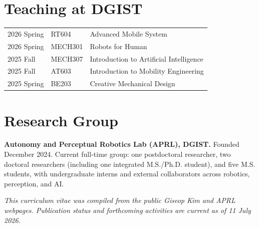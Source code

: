 \documentclass[10pt,a4paper]{article}
\begin{document}
\section{Teaching at DGIST}
\begin{tabularx}{\textwidth}{@{}L{26mm}L{24mm}Y@{}}
2026 Spring & RT604 & Advanced Mobile System \\
2026 Spring & MECH301 & Robots for Human \\
2025 Fall & MECH307 & Introduction to Artificial Intelligence \\
2025 Fall & AT603 & Introduction to Mobility Engineering \\
2025 Spring & BE203 & Creative Mechanical Design \\
\end{tabularx}

\section{Research Group}
\textbf{Autonomy and Perceptual Robotics Lab (APRL), DGIST.} Founded December 2024. Current full-time group: one postdoctoral researcher, two doctoral researchers (including one integrated M.S./Ph.D. student), and five M.S. students, with undergraduate interns and external collaborators across robotics, perception, and AI.

\vfill
{\footnotesize\textit{This curriculum vitae was compiled from the public Giseop Kim and APRL webpages. Publication status and forthcoming activities are current as of 11 July 2026.}}
\end{document}
